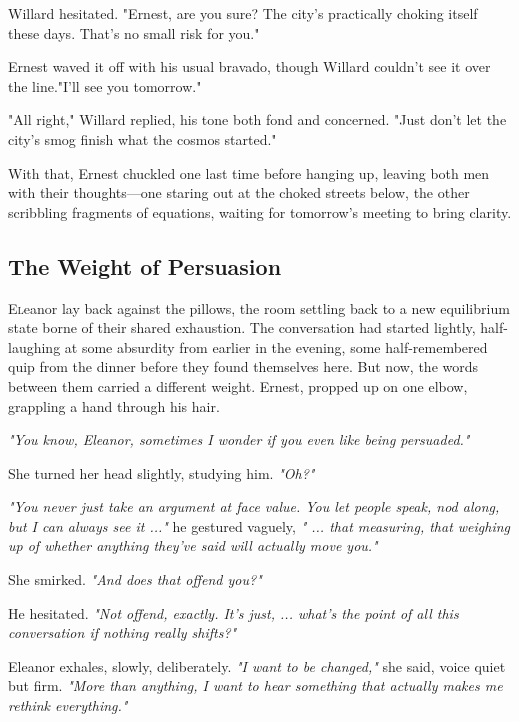 Willard hesitated. "Ernest, are you sure? The city’s practically choking itself these days. That’s no small risk for you."

Ernest waved it off with his usual bravado, though Willard couldn’t see it over the line."I’ll see you tomorrow."

"All right," Willard replied, his tone both fond and concerned. "Just don’t let the city’s smog finish what the cosmos started."

With that, Ernest chuckled one last time before hanging up, leaving both men with their thoughts—one staring out at the choked streets below, the other scribbling fragments of equations, waiting for tomorrow’s meeting to bring clarity.


\subsection*{The Weight of Persuasion}

\noindent\lettrine{E}leanor lay back against the pillows, the room settling back to a new equilibrium state borne of their shared exhaustion. The conversation had started lightly, half-laughing at some absurdity from earlier in the evening, some half-remembered quip from the dinner before they found themselves here. But now, the words between them carried a different weight. Ernest, propped up on one elbow, grappling a hand through his hair.

\smallskip

\textit{"You know, Eleanor, sometimes I wonder if you even like being persuaded."}

\smallskip

She turned her head slightly, studying him.  
\textit{"Oh?"}

\textit{"You never just take an argument at face value. You let people speak, nod along, but I can always see it ..."} he gestured vaguely, \textit{" ... that measuring, that weighing up of whether anything they’ve said will actually move you."}

\smallskip

She smirked.  
\textit{"And does that offend you?"}

He hesitated.  
\textit{"Not offend, exactly. It’s just, ... what’s the point of all this conversation if nothing really shifts?"}

Eleanor exhales, slowly, deliberately.  
\textit{"I want to be changed,"} she said, voice quiet but firm.  
\textit{"More than anything, I want to hear something that actually makes me rethink everything."}

